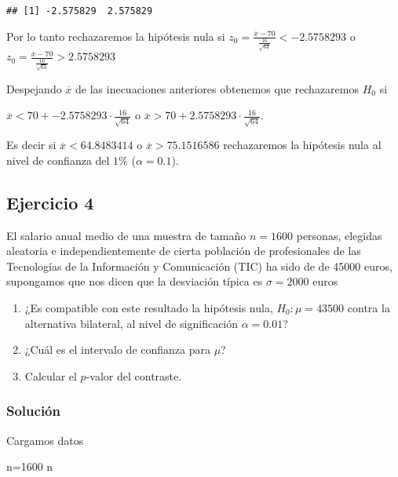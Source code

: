 \documentclass[
]{article}
\newenvironment{Shaded}{\begin{snugshade}}{\end{snugshade}}
\newcommand{\DecValTok}[1]{\textcolor[rgb]{0.00,0.00,0.81}{#1}}
\newcommand{\NormalTok}[1]{#1}
\providecommand{\tightlist}{%
  \setlength{\itemsep}{0pt}\setlength{\parskip}{0pt}}
\begin{document}
\begin{verbatim}
## [1] -2.575829  2.575829
\end{verbatim}

Por lo tanto rechazaremos la hipótesis nula si
\(z_0=\frac{\overline{x}-70}{\frac{16}{\sqrt{64}}} < -2.5758293\) o
\(z_0=\frac{\overline{x}-70}{\frac{16}{\sqrt{64}}} > 2.5758293\)

Despejando \(\overline{x}\) de las inecuaciones anteriores obtenemos que
rechazaremos \(H_0\) si

\(\overline{x}<70 + -2.5758293\cdot \frac{16}{\sqrt{64}}\) o
\(\overline{x}>70 + 2.5758293\cdot \frac{16}{\sqrt{64}}\).

Es decir si \(\overline{x}<64.8483414\) o \(\overline{x}>75.1516586\)
rechazaremos la hipótesis nula al nivel de confianza del \(1\%\)
(\(\alpha=0.1\)).

\hypertarget{ejercicio-4}{%
\subsection{Ejercicio 4}\label{ejercicio-4}}

El salario anual medio de una muestra de tamaño \(n= 1600\) personas,
elegidas aleatoria e independientemente de cierta población de
profesionales de las Tecnologías de la Información y Comunicación (TIC)
ha sido de de 45000 euros, supongamos que nos dicen que la desviación
típica es \(\sigma=2000\) euros

\begin{enumerate}
\def\labelenumi{\arabic{enumi}.}
\tightlist
\item
  ¿Es compatible con este resultado la hipótesis nula,
  \(H_{0}:\mu=43500\) contra la alternativa bilateral, al nivel de
  significación \(\alpha=0.01\)?
\item
  ¿Cuál es el intervalo de confianza para \(\mu\)?
\item
  Calcular el \(p\)-valor del contraste.
\end{enumerate}

\hypertarget{soluciuxf3n-3}{%
\subsubsection{Solución}\label{soluciuxf3n-3}}

Cargamos datos

\begin{Shaded}
\begin{Highlighting}[]
\NormalTok{n=}\DecValTok{1600}
\NormalTok{n}
\end{Highlighting}
\end{Shaded}
\end{document}
